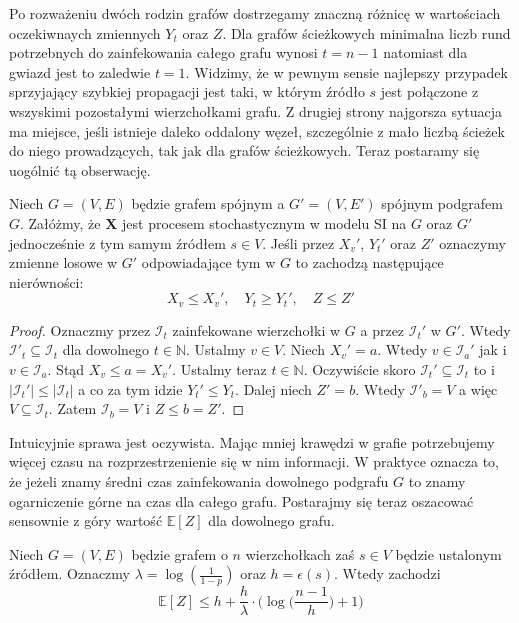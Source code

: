Po rozważeniu dwóch rodzin grafów dostrzegamy znaczną różnicę w wartościach oczekiwnaych zmiennych $Y_t$ oraz $Z$. Dla grafów ścieżkowych minimalna liczb rund potrzebnych do zainfekowania całego grafu wynosi $t=n-1$ natomiast dla gwiazd jest to zaledwie $t=1$. Widzimy, że w pewnym sensie najlepszy przypadek sprzyjający szybkiej propagacji jest taki, w którym źródło $s$ jest połączone z wszyskimi pozostałymi wierzchołkami grafu. Z drugiej strony najgorsza sytuacja ma miejsce, jeśli istnieje daleko oddalony węzeł, szczególnie z mało liczbą ścieżek do niego prowadzących, tak jak dla grafów ścieżkowych. Teraz postaramy się uogólnić tą obserwację. 

\begin{theorem}\label{theorem:montonicity_of_total_infection}
Niech $G=(V,E)$ będzie grafem spójnym a $G'=(V,E')$ spójnym podgrafem $G$. Załóżmy, że $\mathbf{X}$ jest procesem stochastycznym w modelu SI na $G$ oraz $G'$ jednocześnie z tym samym źródłem $s\in V$. Jeśli przez $X_v'$, $Y_t'$ oraz $Z'$ oznaczymy zmienne losowe w $G'$ odpowiadające tym w  $G$ to zachodzą następujące nierówności:
\[
    X_v \le X_v', \quad Y_t \ge Y_t', \quad Z\le Z'
\] 
\end{theorem}
\begin{proof}
Oznaczmy przez $\mathcal{I}_t$ zainfekowane wierzchołki w $G$ a przez $\mathcal{I}_t'$ w $G'$. Wtedy $\mathcal{I}'_t\subseteq\mathcal{I}_t$ dla dowolnego $t\in\mathbb{N}$. Ustalmy $v\in V$. Niech $X_v'=a$. Wtedy $v\in\mathcal{I}_a'$ jak i $v\in\mathcal{I}_a$. Stąd $X_v\le a=X_v'$. Ustalmy teraz $t\in\mathbb{N}$. Oczywiście skoro $\mathcal{I}_t'\subseteq\mathcal{I}_t$ to i $|\mathcal{I}_t'|\le|\mathcal{I}_t|$ a co za tym idzie $Y_t'\le Y_t$. Dalej niech $Z' = b$. Wtedy $\mathcal{I}'_b =V$ a więc $V\subseteq \mathcal{I}_t$. Zatem $\mathcal{I}_b = V$ i $Z\le b=Z'$. 
\end{proof}

Intuicyjnie sprawa jest oczywista. Mając mniej krawędzi w grafie potrzebujemy więcej czasu na rozprzestrzenienie się w nim informacji. W praktyce oznacza to, że jeżeli znamy średni czas zainfekowania dowolnego podgrafu $G$ to znamy ogarniczenie górne na czas dla całego grafu. Postarajmy się teraz oszacować sensownie z góry wartość $\mathbb{E}[Z]$ dla dowolnego grafu.

\begin{theorem}\label{theorem:upper_bound_on_EZ}
Niech $G=(V,E)$ będzie grafem o $n$ wierzchołkach zaś $s\in V$ będzie ustalonym źródłem. Oznaczmy $\lambda=\log(\frac{1}{1-p})$ oraz $h = \epsilon(s)$. Wtedy zachodzi
\[
    \mathbb{E}[Z] \le h  + \frac{h}{\lambda} \cdot \Big(\log\Big(\frac{n-1}{h}\Big) + 1\Big)
\]
\end{theorem}


